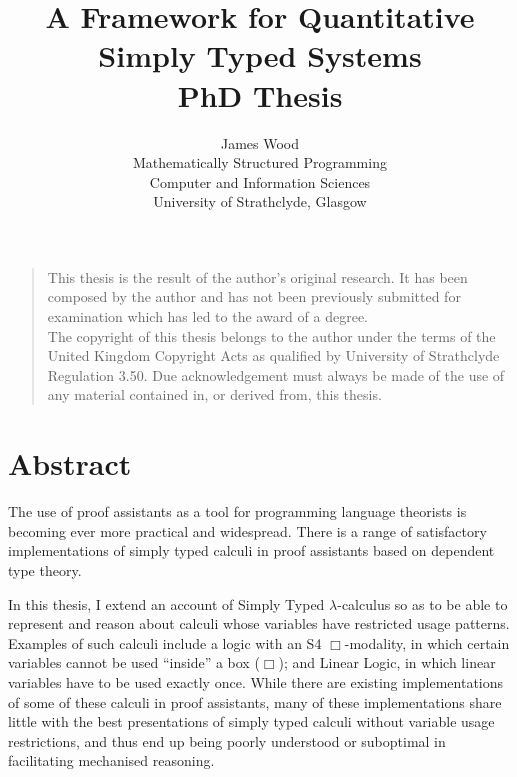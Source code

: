 \documentclass[a4paper,oneside,11pt]{book}
\title{A Framework for Quantitative Simply Typed Systems \\ PhD Thesis}
\author{James Wood
\\ \small Mathematically Structured Programming\\[-0.8ex]
\small Computer and Information Sciences\\[-0.8ex]
\small University of Strathclyde, Glasgow\\
}
\theoremstyle{definition}
\begin{document}
\maketitle


\frontmatter

\vspace*{\fill}
\noindent
\begin{quote}
  \centering
  This thesis is the result of the author's original research. It has been composed by the author and has not been previously submitted for examination which has led to the award of a degree. \\[5pt]
  The copyright of this thesis belongs to the author under the terms of the United Kingdom Copyright Acts as qualified by University of Strathclyde Regulation 3.50. Due acknowledgement must always be made of the use of any material contained in, or derived from, this thesis. \\[5pt]
\end{quote}
\vspace*{\fill}



\chapter{Abstract}

The use of proof assistants as a tool for programming language theorists is
becoming ever more practical and widespread.
There is a range of satisfactory implementations of simply typed calculi in
proof assistants based on dependent type theory.

In this thesis, I extend an account of Simply Typed $\lambda$-calculus so as to
be able to represent and reason about calculi whose variables have restricted
usage patterns.
Examples of such calculi include a logic with an S4 $\Box$-modality, in which
certain variables cannot be used ``inside'' a box ($\Box$); and Linear Logic, in
which linear variables have to be used exactly once.
While there are existing implementations of some of these calculi in proof
assistants, many of these implementations share little with the best
presentations of simply typed calculi without variable usage restrictions, and
thus end up being poorly understood or suboptimal in facilitating mechanised
reasoning.
\end{document}
